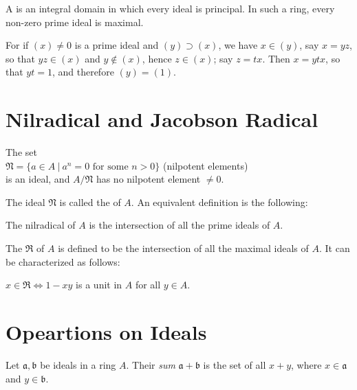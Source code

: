 \begin{eg}
A  is an integral domain in which every ideal is principal. In such a ring, every non-zero prime ideal is maximal.

For if \( (x) \ne 0 \) is a prime ideal and \( (y) \supset (x) \), we have \( x \in (y) \), say \( x = yz \), so that \( yz \in (x) \) and \( y \notin (x) \), hence \( z \in (x) \); say \( z = tx \). Then \( x = ytx \), so that \( yt = 1 \), and therefore \( (y) = (1) \).
\end{eg}


\section{Nilradical and Jacobson Radical}

\begin{prop}
The set \\ $\mathfrak{N} = \{a \in A \ |\ a^n =0 \text{ for some } n>0\}$  (nilpotent elements) \\ is an ideal, and $A/\mathfrak{N}$ has no nilpotent element $\neq 0$.
\end{prop}

The ideal $\mathfrak{N}$ is called the  of $A$. An equivalent definition is the following:

\begin{prop}
The nilradical of $A$ is the intersection of all the prime ideals of $A$.
\end{prop}

The  $\mathfrak{R}$ of $A$ is defined to be the intersection of all the maximal ideals of $A$. It can be characterized as follows:

\begin{prop}
$x \in \mathfrak{R} \iff 1 - xy$ is a unit in $A$ for all $y \in A$.
\end{prop}

\section{Opeartions on Ideals}

\begin{definition}
Let \( \mathfrak{a}, \mathfrak{b} \) be ideals in a ring \( A \). Their \emph{sum} \( \mathfrak{a} + \mathfrak{b} \) is the set of all \( x + y \), where \( x \in \mathfrak{a} \) and \( y \in \mathfrak{b} \).
\end{definition}

